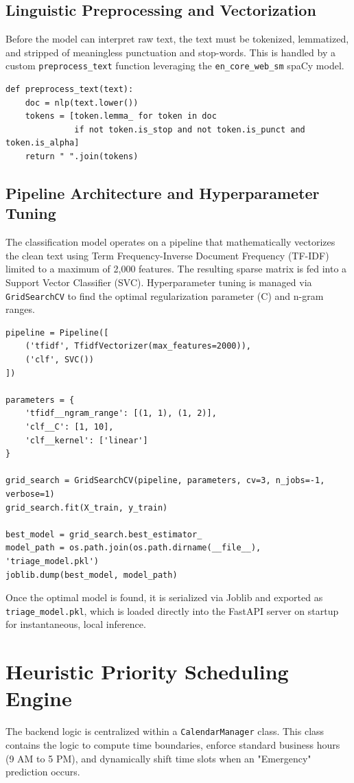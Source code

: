 \documentclass[12pt,a4paper]{report}
\begin{document}
\subsection{Linguistic Preprocessing and Vectorization}
Before the model can interpret raw text, the text must be tokenized, lemmatized, and stripped of meaningless punctuation and stop-words. This is handled by a custom \texttt{preprocess\_text} function leveraging the \texttt{en\_core\_web\_sm} spaCy model.

\begin{verbatim}
def preprocess_text(text):
    doc = nlp(text.lower())
    tokens = [token.lemma_ for token in doc 
              if not token.is_stop and not token.is_punct and token.is_alpha]
    return " ".join(tokens)
\end{verbatim}

\subsection{Pipeline Architecture and Hyperparameter Tuning}
The classification model operates on a pipeline that mathematically vectorizes the clean text using Term Frequency-Inverse Document Frequency (TF-IDF) limited to a maximum of 2,000 features. The resulting sparse matrix is fed into a Support Vector Classifier (SVC). Hyperparameter tuning is managed via \texttt{GridSearchCV} to find the optimal regularization parameter (C) and n-gram ranges.

\begin{verbatim}
pipeline = Pipeline([
    ('tfidf', TfidfVectorizer(max_features=2000)),
    ('clf', SVC())
])

parameters = {
    'tfidf__ngram_range': [(1, 1), (1, 2)],
    'clf__C': [1, 10],
    'clf__kernel': ['linear']
}

grid_search = GridSearchCV(pipeline, parameters, cv=3, n_jobs=-1, verbose=1)
grid_search.fit(X_train, y_train)

best_model = grid_search.best_estimator_
model_path = os.path.join(os.path.dirname(__file__), 'triage_model.pkl')
joblib.dump(best_model, model_path)
\end{verbatim}
Once the optimal model is found, it is serialized via Joblib and exported as \texttt{triage\_model.pkl}, which is loaded directly into the FastAPI server on startup for instantaneous, local inference.

\section{Heuristic Priority Scheduling Engine}
The backend logic is centralized within a \texttt{CalendarManager} class. This class contains the logic to compute time boundaries, enforce standard business hours (9 AM to 5 PM), and dynamically shift time slots when an "Emergency" prediction occurs.
\end{document}
